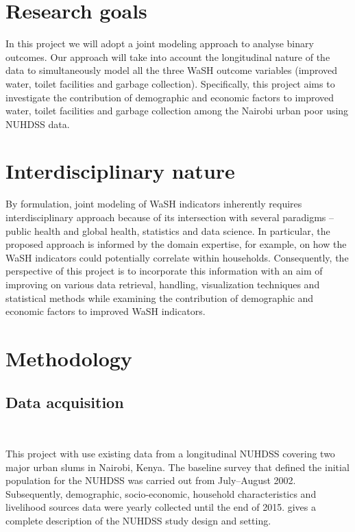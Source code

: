 \section{Research goals}

In this project we will adopt a joint modeling approach to analyse binary outcomes. Our approach will take into account the longitudinal nature of the data to simultaneously model all the three WaSH outcome variables (improved water, toilet facilities and garbage collection). Specifically, this project aims to investigate the contribution of demographic and economic factors to improved water, toilet facilities and garbage collection among the Nairobi urban poor using NUHDSS data.

\section{Interdisciplinary nature}

By formulation, joint modeling of WaSH indicators inherently requires interdisciplinary approach because of its intersection with several paradigms -- public health and global health, statistics and data science. In particular, the proposed approach is informed by the domain expertise, for example, on how the WaSH indicators could potentially correlate within households. Consequently, the perspective of this project is to incorporate this information with an aim of improving on various data retrieval, handling, visualization techniques and statistical methods while examining the contribution of demographic and economic factors to improved WaSH indicators.

\section{Methodology}

\subsection{Data acquisition}

~

This project with use existing data from a longitudinal NUHDSS covering two major urban slums in Nairobi, Kenya. The baseline survey that defined the initial population for the NUHDSS was carried out from July–August 2002. Subsequently, demographic, socio-economic, household characteristics  and livelihood sources data were yearly collected until the end of 2015. \citet{beguy2015health} gives a complete description of the NUHDSS study design and setting.

